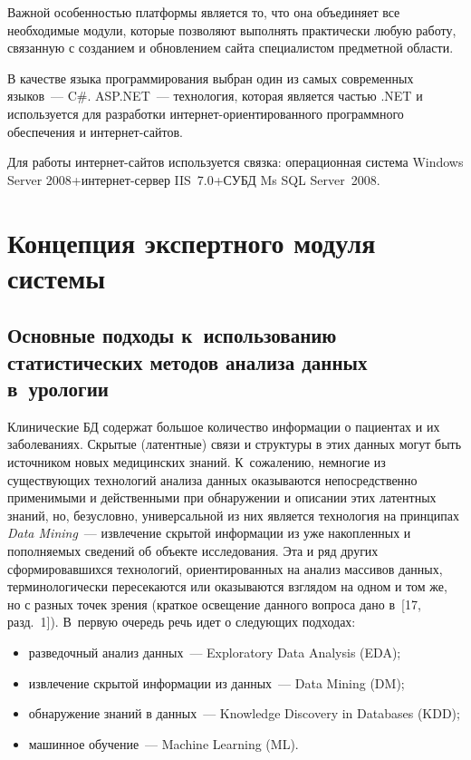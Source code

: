 \begin{multicols}{2}
      Важной особенностью платформы является то, что она объединяет все необходимые 
модули, которые позволяют выполнять практически любую работу, связанную с созданием и 
обновлением сайта специалистом предметной области. 
      
      В качестве языка программирования выбран один из самых современных языков~--- 
C\#. ASP.NET~--- технология, которая является частью .NET и используется для разработки 
ин\-тер\-нет-ори\-ен\-ти\-ро\-ван\-но\-го программного обеспечения и ин\-тер\-нет-сай\-тов. 

Для работы ин\-тер\-нет-сай\-тов используется связка: операционная система Windows Server 
2008\;+\;ин\-тер\-нет-сер\-вер IIS~7.0\;+\;СУБД Ms SQL Server~2008.

\section{Концепция экспертного модуля системы}

\subsection{Основные подходы к~использованию статистических методов анализа данных 
в~урологии}

      Клинические БД содержат большое количество информации о пациентах и их 
заболеваниях. Скрытые (латентные) связи и структуры в этих данных могут быть источником 
новых медицинских знаний. К~сожалению, немногие из существующих технологий анализа 
данных оказываются непосредственно применимыми и действенными при обнаружении и 
описании этих латентных знаний, но, безусловно, универсальной из них является технология 
на принципах \textit{Data Mining}~--- извлечение скрытой информации из уже накопленных и 
пополняемых сведений об объекте исследования. Эта и ряд других сформировавшихся 
технологий, ориентированных на анализ массивов данных, терминологически пересекаются 
или оказываются взглядом на одном и том же, но с разных точек зрения (краткое освещение 
данного вопроса дано в~[17, разд.~1]). В~первую очередь речь идет о следующих 
подходах:
      \begin{itemize}
\item разведочный анализ данных~--- Exploratory Data Analysis (EDA);
\item извлечение скрытой информации из данных~--- Data Mining 
(DM);
\item обнаружение знаний в данных~--- Knowledge Discovery in Databases (KDD);
\item машинное обучение~--- Machine Learning (ML).
\end{itemize}


\end{multicols}
